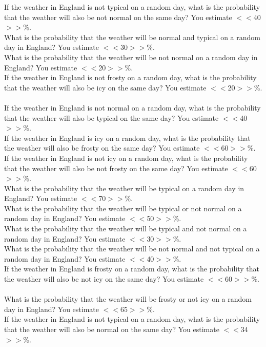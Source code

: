 \documentclass[pdflatex,sn-nature]{sn-jnl}%
\theoremstyle{thmstyleone}%
\theoremstyle{thmstyletwo}%
\theoremstyle{thmstylethree}%
\begin{document}
If the weather in England is not typical on a random day, what is the probability that the weather will also be not normal on the same day? You estimate $<<$40$>>$\%. $~$\\ 
What is the probability that the weather will be normal and typical on a random day in England? You estimate $<<$30$>>$\%. $~$\\ 
What is the probability that the weather will be not normal on a random day in England? You estimate $<<$20$>>$\%. $~$\\ 
If the weather in England is not frosty on a random day, what is the probability that the weather will also be icy on the same day? You estimate $<<$20$>>$\%. $~$\\ 
If the weather in England is not normal on a random day, what is the probability that the weather will also be typical on the same day? You estimate $<<$40$>>$\%. $~$\\ 
If the weather in England is icy on a random day, what is the probability that the weather will also be frosty on the same day? You estimate $<<$60$>>$\%. $~$\\ 
If the weather in England is not icy on a random day, what is the probability that the weather will also be not frosty on the same day? You estimate $<<$60$>>$\%. $~$\\ 
What is the probability that the weather will be typical on a random day in England? You estimate $<<$70$>>$\%. $~$\\ 
What is the probability that the weather will be typical or not normal on a random day in England? You estimate $<<$50$>>$\%. $~$\\ 
What is the probability that the weather will be typical and not normal on a random day in England? You estimate $<<$30$>>$\%. $~$\\ 
What is the probability that the weather will be not normal and not typical on a random day in England? You estimate $<<$40$>>$\%. $~$\\ 
If the weather in England is frosty on a random day, what is the probability that the weather will also be not icy on the same day? You estimate $<<$60$>>$\%. $~$\\ 
What is the probability that the weather will be frosty or not icy on a random day in England? You estimate $<<$65$>>$\%. $~$\\ 
If the weather in England is not typical on a random day, what is the probability that the weather will also be normal on the same day? You estimate $<<$34$>>$\%. $~$\\ 
\end{document}
